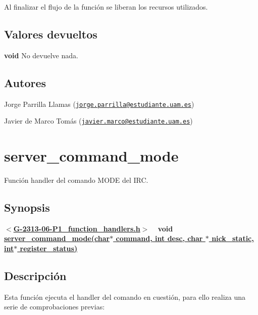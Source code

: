 Al finalizar el flujo de la función se liberan los recursos utilizados.\hypertarget{server_command_kick_return_kick}{}\subsection{Valores devueltos}\label{server_command_kick_return_kick}

\begin{DoxyItemize}
\item {\bfseries void} No devuelve nada. 
\end{DoxyItemize}\hypertarget{server_command_kick_authors_kick}{}\subsection{Autores}\label{server_command_kick_authors_kick}

\begin{DoxyItemize}
\item Jorge Parrilla Llamas (\href{mailto:jorge.parrilla@estudiante.uam.es}{\tt jorge.\+parrilla@estudiante.\+uam.\+es}) 
\item Javier de Marco Tomás (\href{mailto:javier.marco@estudiante.uam.es}{\tt javier.\+marco@estudiante.\+uam.\+es}) 
\end{DoxyItemize}\hypertarget{server_command_mode}{}\section{server\+\_\+command\+\_\+mode}\label{server_command_mode}
Función handler del comando M\+O\+D\+E del I\+R\+C.\hypertarget{server_command_mode_synopsis_mode}{}\subsection{Synopsis}\label{server_command_mode_synopsis_mode}
{ {\bfseries $<$\hyperlink{G-2313-06-P1__function__handlers_8h}{G-\/2313-\/06-\/\+P1\+\_\+function\+\_\+handlers.\+h}$>$} ~\newline
 {\bfseries void \hyperlink{G-2313-06-P1__function__handlers_8c_a44a8736512c1df49d94c8194ae9b8a50}{server\+\_\+command\+\_\+mode(char$\ast$ command, int desc, char $\ast$ nick\+\_\+static, int$\ast$ register\+\_\+status)}} } \hypertarget{server_command_mode_descripcion_mode}{}\subsection{Descripción}\label{server_command_mode_descripcion_mode}
Esta función ejecuta el handler del comando en cuestión, para ello realiza una serie de comprobaciones previas\+:


